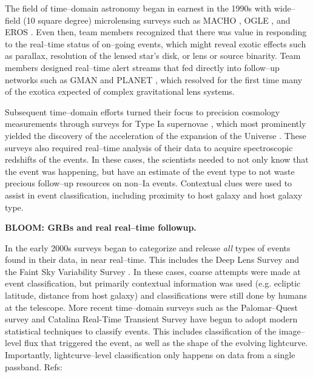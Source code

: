  \smallskip

The field of time--domain astronomy began in earnest in the 1990s with
wide--field (10 square degree) microlensing surveys such as MACHO
\citep{2000ApJ...542..281A}, OGLE \citep{1994AcA....44..227U}, and EROS
\citep{2003A&A...400..951A}.   Even then, team members recognized that there was
value in responding to the real--time status of on--going events, which might
reveal exotic effects such as parallax, resolution of the lensed star's disk, or
lens or source binarity.  Team members designed real--time alert streams that
fed directly into follow--up networks such as GMAN \citep{2000PhDT.......258B}
and PLANET \citep{1998ApJ...509..687A}, which resolved for the first time many
of the exotica expected of complex gravitational lens systems.

Subsequent time--domain efforts turned their focus to precision cosmology
measurements through surveys for Type Ia supernovae \citep{1996AJ....112.2398H},
which most prominently yielded the discovery of the acceleration of the
expansion of the Universe \citep{1998AJ....116.1009R,1999ApJ...517..565P}. These
surveys also required real--time analysis of their data to acquire spectroscopic
redshifts of the events. In these cases, the scientists needed to not only know
that the event was happening, but have an estimate of the event type to not
waste precious follow--up resources on non--Ia events.  Contextual clues were
used to assist in event classification, including proximity to host galaxy and
host galaxy type.

{\bf BLOOM: GRBs and real real--time followup.}

In the early 2000s surveys began to categorize and release {\it all} types of
events found in their data, in near real--time. This includes the Deep Lens
Survey \citep{Becker04a} and the Faint Sky Variability Survey
\citep{2003MNRAS.339..427G}.  In these cases, coarse attempts were made at event
classification, but primarily contextual information was used (e.g. ecliptic
latitude, distance from host galaxy) and classifications were still done by
humans at the telescope.  More recent time--domain surveys such as the
Palomar--Quest survey \citep{2008AN....329..263D} and Catalina Real-Time
Transient Survey \citep{2011arXiv1102.5004D} have begun to adopt modern
statistical techniques to classify events.  This includes classification of the
image--level flux that triggered the event, as well as the shape of the evolving
lightcurve.  Importantly, lightcurve--level classification only happens on data
from a single passband.  Refs: \citep{2008AIPC.1082..252D}
\citep{2010ASPC..434..115M}

